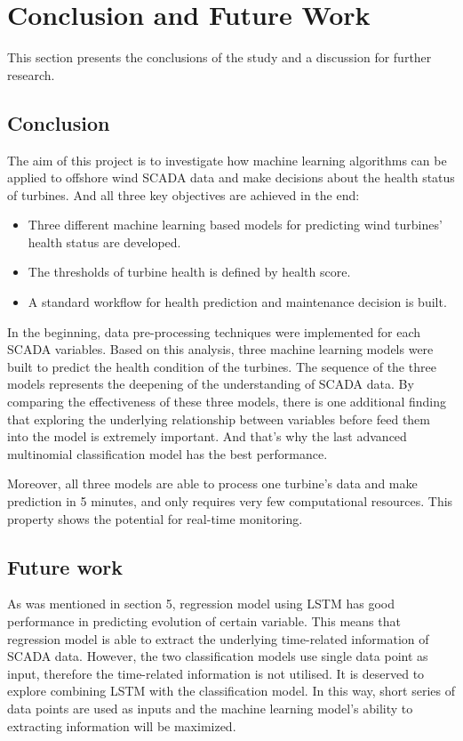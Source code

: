 \section{Conclusion and Future Work}
This section presents the conclusions of the study and a discussion for further research.

\subsection{Conclusion}
The aim of this project is to investigate how machine learning algorithms can be applied to offshore wind SCADA data and make decisions about the health status of turbines. And all three key objectives are achieved in the end:

\begin{itemize}
\item Three different machine learning based models for predicting wind turbines' health status are developed.
\item The thresholds of turbine health is defined by health score.
\item A standard workflow for health prediction and maintenance decision is built.
\end{itemize}

In the beginning, data pre-processing techniques were implemented for each SCADA variables. Based on this analysis, three machine learning models were built to predict the health condition of the turbines. The sequence of the three models represents the deepening of the understanding of SCADA data. By comparing the effectiveness of these three models, there is one additional finding that exploring the underlying relationship between variables before feed them into the model is extremely important. And that's why the last advanced multinomial classification model has the best performance.

Moreover, all three models are able to process one turbine's data and make prediction in 5 minutes, and only requires very few computational resources. This property shows the potential for real-time monitoring.

\subsection{Future work}

As was mentioned in section 5, regression model using LSTM has good performance in predicting evolution of certain variable. This means that regression model is able to extract the underlying time-related information of SCADA data. However, the two classification models use single data point as input, therefore the time-related information is not utilised. It is deserved to explore combining LSTM with the classification model. In this way, short series of data points are used as inputs and the machine learning model's ability to extracting information will be maximized.